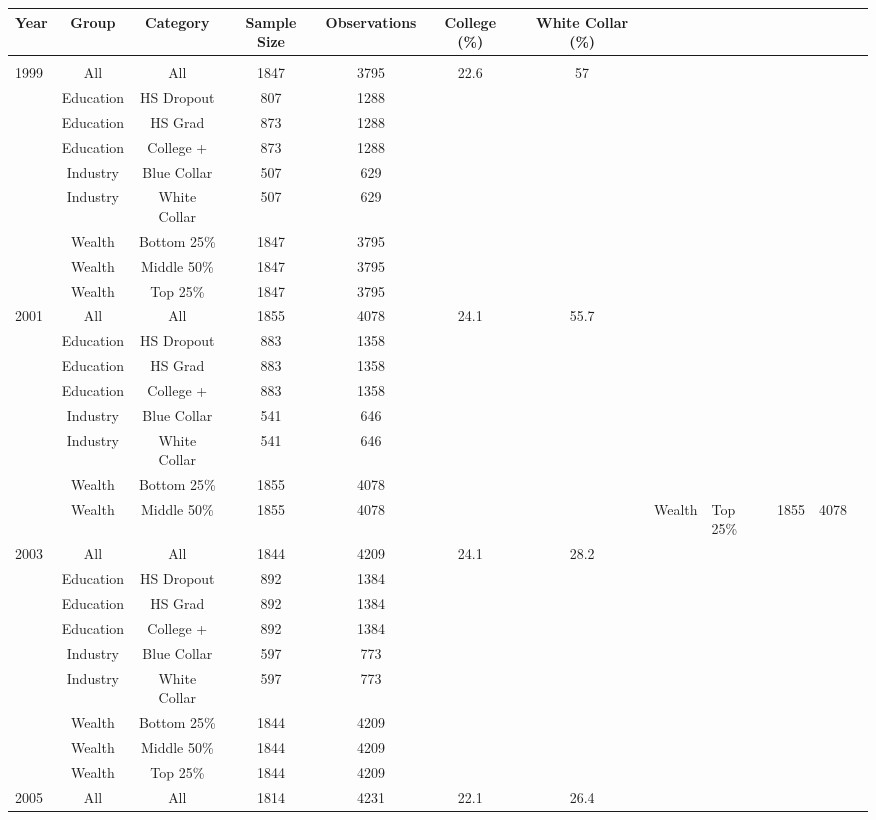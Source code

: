 \documentclass[12pt]{article}
\begin{document}
\begin{tabular}{||l|c|c|c|c|c|c||}
  Year & Group & Category & Sample Size & Observations & College (\%) & White Collar (\%) \\
  \hline\hline \\
  1999 & All & All & 1847 & 3795 & 22.6 & 57 \\
  & Education & HS Dropout & 807 & 1288 & & \\
  & Education & HS Grad & 873 & 1288 & & \\
  & Education & College + & 873 & 1288 & & \\
  & Industry & Blue Collar & 507 & 629 & & \\
  & Industry & White Collar & 507 & 629 & & \\
  & Wealth & Bottom 25\% & 1847 & 3795 & & \\
  & Wealth & Middle 50\% & 1847 & 3795 & & \\
  & Wealth & Top 25\% & 1847 & 3795 & & \\
  2001 & All & All & 1855 & 4078 & 24.1 & 55.7 \\
  & Education & HS Dropout & 883 & 1358 & & \\
  & Education & HS Grad & 883 & 1358 & & \\
  & Education & College + & 883 & 1358 & & \\
  & Industry & Blue Collar & 541 & 646 & & \\
  & Industry & White Collar & 541 & 646 & & \\
  & Wealth & Bottom 25\% & 1855 & 4078 & & \\
  & Wealth & Middle 50\% & 1855 & 4078 & &
  & Wealth & Top 25\% & 1855 & 4078 & & \\
  2003 & All & All & 1844 & 4209 & 24.1 & 28.2 \\
  & Education & HS Dropout & 892 & 1384 & & \\
  & Education & HS Grad & 892 & 1384 & & \\
  & Education & College + & 892 & 1384 & & \\
  & Industry & Blue Collar & 597 & 773 & & \\
  & Industry & White Collar & 597 & 773 & & \\
  & Wealth & Bottom 25\% & 1844 & 4209 & & \\
  & Wealth & Middle 50\% & 1844 & 4209 & & \\
  & Wealth & Top 25\% & 1844 & 4209 & & \\
  2005 & All & All & 1814 & 4231 & 22.1 & 26.4 \\

\end{tabular}
\end{document}

